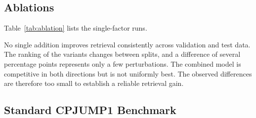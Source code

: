 \subsection{Ablations}

Table~\ref{tab:ablation} lists the single-factor runs.

\begin{table}[t]
  \centering
  \caption{Single-factor ablations from a shared control. Values are perturbation-level Recall@10
    in percent and median rank. Random Recall@10 is 10.2 on validation and 11.6 on test.}
  \label{tab:ablation}
\end{table}

No single addition improves retrieval consistently across validation and test data. The ranking of
the variants changes between splits, and a difference of several percentage points represents only
a few perturbations. The combined model is competitive in both directions but is not uniformly
best. The observed differences are therefore too small to establish a reliable retrieval gain.

\subsection{Standard CPJUMP1 Benchmark}

